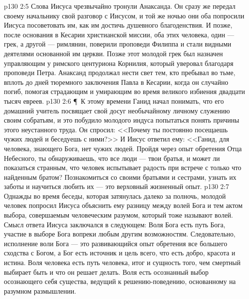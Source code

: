 \vs p130 2:5 Слова Иисуса чрезвычайно тронули Анаксанда. Он сразу же передал своему начальнику свой разговор с Иисусом, и той же ночью они оба попросили Иисуса посоветовать им, как им достичь душевного благоденствия. И позже, после основания в Кесарии христианской миссии, оба этих человека, один --- грек, а другой --- римлянин, поверили проповеди Филиппа и стали видными деятелями основанной им церкви. Позже этот молодой грек был назначен управляющим у римского центуриона Корнилия, который уверовал благодаря проповеди Петра. Анаксанд продолжал нести свет тем, кто пребывал во тьме, вплоть до дней тюремного заключения Павла в Кесарии, когда он случайно погиб, помогая страдающим и умирающим во время великого избиения двадцати тысяч евреев.
\vs p130 2:6 \P\ К этому времени Ганид начал понимать, что его домашний учитель посвящает свой досуг необычайному личному служению своим собратьям, и это побудило молодого индуса попытаться понять причины этого неустанного труда. Он спросил: <<Почему ты постоянно посещаешь чужих людей и беседуешь с ними?>> И Иисус ответил ему: <<Ганид, для человека, знающего Бога, нет чужих людей. Пройдя через опыт обретения Отца Небесного, ты обнаруживаешь, что все люди --- твои братья, и может ли показаться странным, что человек испытывает радость при встрече с только что найденным братом? Познакомиться со своими братьями и сестрами, узнать их заботы и научиться любить их --- это верховный жизненный опыт.
\vs p130 2:7 Однажды во время беседы, которая затянулась далеко за полночь, молодой человек попросил Иисуса объяснить ему разницу между волей Бога и тем актом выбора, совершаемым человеческим разумом, который тоже называют волей. Смысл ответа Иисуса заключался в следующем: Воля Бога есть путь Бога, участие в выборе Бога вопреки любым другим возможностям. Следовательно, исполнение воли Бога --- это развивающийся опыт обретения все большего сходства с Богом, а Бог есть источник и цель всего, что есть добро, красота и истина. Воля человека есть путь человека, итог и сущность того, чем смертный выбирает быть и что он решает делать. Воля есть осознанный выбор осознающего себя существа, ведущий к решению\hyp{}поведению, основанному на разумном размышлении.
